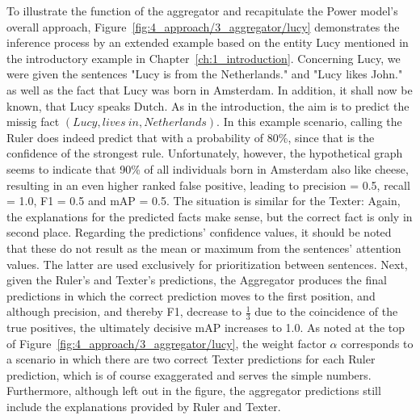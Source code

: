 To illustrate the function of the aggregator and recapitulate the Power model's overall approach, Figure~\ref{fig:4_approach/3_aggregator/lucy} demonstrates the inference process by an extended example based on the entity Lucy mentioned in the introductory example in Chapter~\ref{ch:1_introduction}. Concerning Lucy, we were given the sentences "Lucy is from the Netherlands." and "Lucy likes John." as well as the fact that Lucy was born in Amsterdam. In addition, it shall now be known, that Lucy speaks Dutch. As in the introduction, the aim is to predict the missig fact $(Lucy, lives~in, Netherlands)$. In this example scenario, calling the Ruler does indeed predict that with a probability of 80\%, since that is the confidence of the strongest rule. Unfortunately, however, the hypothetical graph seems to indicate that 90\% of all individuals born in Amsterdam also like cheese, resulting in an even higher ranked false positive, leading to precision = 0.5, recall = 1.0, F1 = 0.5 and mAP = 0.5. The situation is similar for the Texter: Again, the explanations for the predicted facts make sense, but the correct fact is only in second place. Regarding the predictions' confidence values, it should be noted that these do not result as the mean or maximum from the sentences' attention values. The latter are used exclusively for prioritization between sentences. Next, given the Ruler's and Texter's predictions, the Aggregator produces the final predictions in which the correct prediction moves to the first position, and although precision, and thereby F1, decrease to $\frac{1}{3}$ due to the coincidence of the true positives, the ultimately decisive mAP increases to 1.0. As noted at the top of Figure~\ref{fig:4_approach/3_aggregator/lucy}, the weight factor $\alpha$ corresponds to a scenario in which there are two correct Texter predictions for each Ruler prediction, which is of course exaggerated and serves the simple numbers. Furthermore, although left out in the figure, the aggregator predictions still include the explanations provided by Ruler and Texter.
